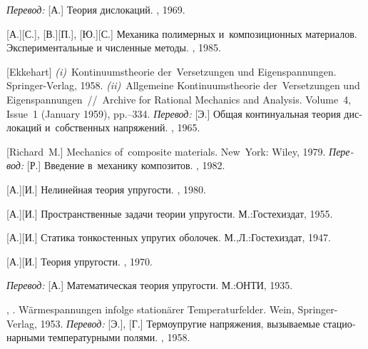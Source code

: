 \begin{thebibliography}{123}
\begin{otherlanguage}{russian}
\emph{Перевод:} [А.] Теория дислокаций. \mirpublisher, 1969. 

[А.][С.], [В.][П.], [Ю.][С.] Механика полимерных и~композиционных материалов. Экспериментальные и численные методы. \naukapublisher, 1985. 

[Ekkehart] \emph{(i)}~Kontinuumstheorie der~Versetzungen und Eigen\-spannung\-en. Springer\hbox{-}Verlag, 1958. 
\emph{(ii)}~Allgemeine Kontinuumstheorie der~Versetzungen und Eigen\-span\-nung\-en~//~Archive for Rational Mechanics and Analysis. Volume~4, Issue~1 (January 1959), pp.\hbox{--}334.
\emph{Перевод:} [Э.] Общая континуальная теория дислокаций и~собственных напряжений. \mirpublisher, 1965. 

[Richard~M.] Mechanics of~composite materials. New~York: Wiley, 1979. 
\emph{Перевод:} [Р.] Введение в~механику композитов. \mirpublisher, 1982. 

[А.][И.] Нелинейная теория упругости. \naukapublisher, 1980. 

[А.][И.] Пространственные задачи теории упругости. М.:\;Гос\-тех\-издат, 1955. 

[А.][И.] Статика тонкостенных упругих оболочек. М.,\:Л.:\;Гос\-тех\-издат, 1947. 

[А.][И.] Теория упругости. \naukapublisher, 1970. 

\emph{Перевод:} [А.] Математическая теория упругости. М.:\;ОНТИ, 1935. 

, . Wärmespannungen infolge stationärer Temperaturfelder. Wein, Springer-Verlag, 1953. 
\emph{Перевод:} [Э.], [Г.] Термоупругие напряжения, вызываемые стационарными температурными полями. \fizmatgiz, 1958. 


\end{otherlanguage}
\end{thebibliography}
